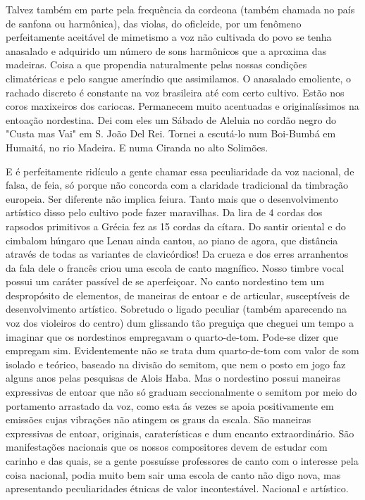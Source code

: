 Talvez também em parte pela frequência da cordeona (também chamada no
país de sanfona ou harmônica), das violas, do oficleide, por um fenômeno
perfeitamente aceitável de mimetismo a voz não cultivada do povo se
tenha anasalado e adquirido um número de sons harmônicos que a aproxima
das madeiras. Coisa a que propendia naturalmente pelas nossas condições
climatéricas e pelo sangue ameríndio que assimilamos. O anasalado
emoliente, o rachado discreto é constante na voz brasileira até com
certo cultivo. Estão nos coros maxixeiros dos cariocas. Permanecem muito
acentuadas e originalíssimos na entoação nordestina. Dei com eles um
Sábado de Aleluia no cordão negro do "Custa mas Vai" em S. João Del Rei.
Tornei a escutá-lo num Boi-Bumbá em Humaitá, no rio Madeira. E numa
Ciranda no alto Solimões.~

E é perfeitamente ridículo a gente chamar essa peculiaridade da voz
nacional, de falsa, de feia, só porque não concorda com a claridade
tradicional da timbração europeia. Ser diferente não implica feiura.
Tanto mais que o desenvolvimento artístico disso pelo cultivo pode fazer
maravilhas. Da lira de 4 cordas dos rapsodos primitivos a Grécia fez as
15 cordas da cítara. Do santir oriental e do cimbalom húngaro que Lenau
ainda cantou, ao piano de agora, que distância através de todas as
variantes de clavicórdios! Da crueza e dos erres arranhentos da fala
dele o francês criou uma escola de canto magnífico. Nosso timbre vocal
possui um caráter passível de se aperfeiçoar. No canto nordestino tem um
despropósito de elementos, de maneiras de entoar e de articular,
susceptíveis de desenvolvimento artístico. Sobretudo o ligado peculiar
(também aparecendo na voz dos violeiros do centro) dum glissando tão
preguiça que cheguei um tempo a imaginar que os nordestinos empregavam o
quarto-de-tom. Pode-se dizer que empregam sim. Evidentemente não se
trata dum quarto-de-tom com valor de som isolado e teórico, baseado na
divisão do semitom, que nem o posto em jogo faz alguns anos pelas
pesquisas de Alois Haba. Mas o nordestino possui maneiras expressivas de
entoar que não só graduam seccionalmente o semitom por meio do
portamento arrastado da voz, como esta ás vezes se apoia positivamente
em emissões cujas vibrações não atingem os graus da escala. São maneiras
expressivas de entoar, originais, caraterísticas e dum encanto
extraordinário. São manifestações nacionais que os nossos compositores
devem de estudar com carinho e das quais, se a gente possuísse
professores de canto com o interesse pela coisa nacional, podia muito
bem sair uma escola de canto não digo nova, mas apresentando
peculiaridades étnicas de valor incontestável. Nacional e artístico.~

